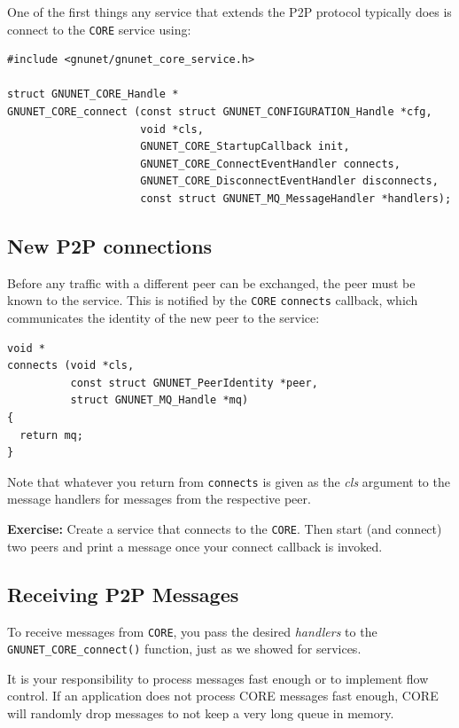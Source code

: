 \documentclass[10pt]{article}
\newcommand{\exercise}[1]{\noindent\begin{boxedminipage}{\textwidth}{\bf Exercise:} #1 \end{boxedminipage}}
\begin{document}
One of the first things any service that extends the P2P protocol typically does
is connect to the \texttt{CORE} service using:

\lstset{language=C}
\begin{lstlisting}
#include <gnunet/gnunet_core_service.h>

struct GNUNET_CORE_Handle *
GNUNET_CORE_connect (const struct GNUNET_CONFIGURATION_Handle *cfg,
                     void *cls,
                     GNUNET_CORE_StartupCallback init,
                     GNUNET_CORE_ConnectEventHandler connects,
                     GNUNET_CORE_DisconnectEventHandler disconnects,
                     const struct GNUNET_MQ_MessageHandler *handlers);
\end{lstlisting}

\subsection{New P2P connections}

Before any traffic with a different peer can be exchanged, the peer must be
known to the service. This is notified by the \texttt{CORE} {\tt connects} callback,
which communicates the identity of the new peer to the service:

\lstset{language=C}
\begin{lstlisting}
void *
connects (void *cls,
          const struct GNUNET_PeerIdentity *peer,
          struct GNUNET_MQ_Handle *mq)
{
  return mq;
}
\end{lstlisting}

Note that whatever you return from {\tt connects} is given as the
{\it cls} argument to the message handlers for messages from
the respective peer.

\exercise{Create a service that connects to the \texttt{CORE}.  Then
start (and connect) two peers and print a message once your connect
callback is invoked.}

\subsection{Receiving P2P Messages}

To receive messages from \texttt{CORE}, you pass the desired
{\em handlers} to the {\tt GNUNET\_CORE\_connect()} function,
just as we showed for services.

It is your responsibility to process messages fast enough or
to implement flow control. If an application does not process
CORE messages fast enough, CORE will randomly drop messages
to not keep a very long queue in memory.
\end{document}
